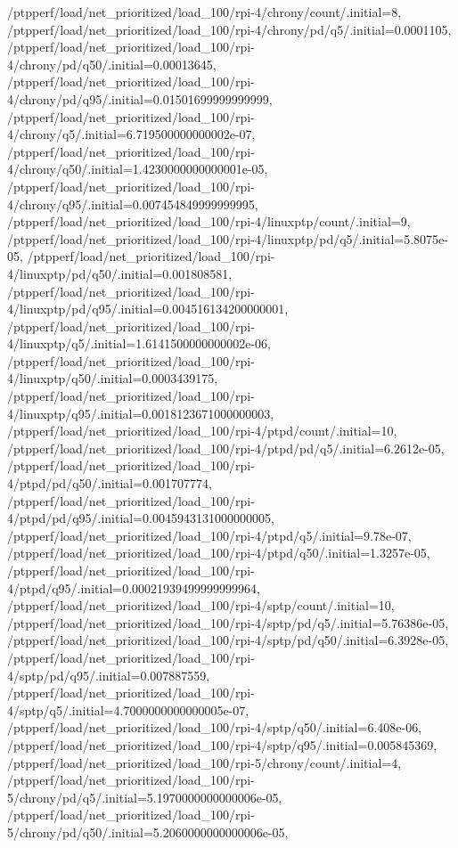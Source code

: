 {    /ptpperf/load/net_prioritized/load_100/rpi-4/chrony/count/.initial=8,
    /ptpperf/load/net_prioritized/load_100/rpi-4/chrony/pd/q5/.initial=0.0001105,
    /ptpperf/load/net_prioritized/load_100/rpi-4/chrony/pd/q50/.initial=0.00013645,
    /ptpperf/load/net_prioritized/load_100/rpi-4/chrony/pd/q95/.initial=0.01501699999999999,
    /ptpperf/load/net_prioritized/load_100/rpi-4/chrony/q5/.initial=6.719500000000002e-07,
    /ptpperf/load/net_prioritized/load_100/rpi-4/chrony/q50/.initial=1.4230000000000001e-05,
    /ptpperf/load/net_prioritized/load_100/rpi-4/chrony/q95/.initial=0.007454849999999995,
    /ptpperf/load/net_prioritized/load_100/rpi-4/linuxptp/count/.initial=9,
    /ptpperf/load/net_prioritized/load_100/rpi-4/linuxptp/pd/q5/.initial=5.8075e-05,
    /ptpperf/load/net_prioritized/load_100/rpi-4/linuxptp/pd/q50/.initial=0.001808581,
    /ptpperf/load/net_prioritized/load_100/rpi-4/linuxptp/pd/q95/.initial=0.004516134200000001,
    /ptpperf/load/net_prioritized/load_100/rpi-4/linuxptp/q5/.initial=1.6141500000000002e-06,
    /ptpperf/load/net_prioritized/load_100/rpi-4/linuxptp/q50/.initial=0.0003439175,
    /ptpperf/load/net_prioritized/load_100/rpi-4/linuxptp/q95/.initial=0.0018123671000000003,
    /ptpperf/load/net_prioritized/load_100/rpi-4/ptpd/count/.initial=10,
    /ptpperf/load/net_prioritized/load_100/rpi-4/ptpd/pd/q5/.initial=6.2612e-05,
    /ptpperf/load/net_prioritized/load_100/rpi-4/ptpd/pd/q50/.initial=0.001707774,
    /ptpperf/load/net_prioritized/load_100/rpi-4/ptpd/pd/q95/.initial=0.0045943131000000005,
    /ptpperf/load/net_prioritized/load_100/rpi-4/ptpd/q5/.initial=9.78e-07,
    /ptpperf/load/net_prioritized/load_100/rpi-4/ptpd/q50/.initial=1.3257e-05,
    /ptpperf/load/net_prioritized/load_100/rpi-4/ptpd/q95/.initial=0.00021939499999999964,
    /ptpperf/load/net_prioritized/load_100/rpi-4/sptp/count/.initial=10,
    /ptpperf/load/net_prioritized/load_100/rpi-4/sptp/pd/q5/.initial=5.76386e-05,
    /ptpperf/load/net_prioritized/load_100/rpi-4/sptp/pd/q50/.initial=6.3928e-05,
    /ptpperf/load/net_prioritized/load_100/rpi-4/sptp/pd/q95/.initial=0.007887559,
    /ptpperf/load/net_prioritized/load_100/rpi-4/sptp/q5/.initial=4.7000000000000005e-07,
    /ptpperf/load/net_prioritized/load_100/rpi-4/sptp/q50/.initial=6.408e-06,
    /ptpperf/load/net_prioritized/load_100/rpi-4/sptp/q95/.initial=0.005845369,
    /ptpperf/load/net_prioritized/load_100/rpi-5/chrony/count/.initial=4,
    /ptpperf/load/net_prioritized/load_100/rpi-5/chrony/pd/q5/.initial=5.1970000000000006e-05,
    /ptpperf/load/net_prioritized/load_100/rpi-5/chrony/pd/q50/.initial=5.2060000000000006e-05,
}
